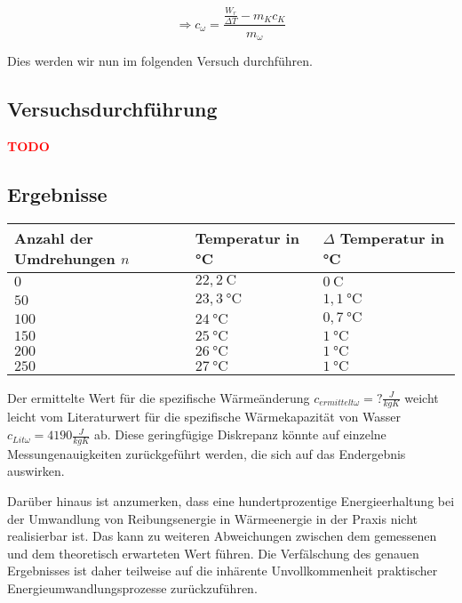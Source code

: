 		$$ \Rightarrow c_{\omega} = \frac{\frac{W_{r}}{\Delta T} - m_{K}c_{K}}{m_{\omega}}$$		
		
		Dies werden wir nun im folgenden Versuch durchführen.
		
	    \subsection{Versuchsdurchführung}
		
        \textbf{\textcolor{red}{TODO}}
	
  
    \subsection{Ergebnisse}

        \begin{table}[H]
            \centering
            \begin{tabular}{|l|l|l|}
                \hline
                Anzahl der Umdrehungen $n$ & Temperatur in °C & $\Delta$ Temperatur in °C\\
                \hline
                $0$ & $22,2\ \mathrm{C}$ & $0\ \mathrm{C}$\\
                \hline
                $50$ & $23,3\ \mathrm{°C}$ & $1,1\ \mathrm{°C}$\\
                \hline
                $100$ & $24\ \mathrm{°C}$ & $0,7\ \mathrm{°C}$\\
                \hline
                $150$ & $25\ \mathrm{°C}$ & $1\ \mathrm{°C}$\\
                \hline
                $200$ & $26\ \mathrm{°C}$ & $1\ \mathrm{°C}$\\
                \hline
                $250$ & $27\ \mathrm{°C}$ & $1\ \mathrm{°C}$\\
                \hline
            \end{tabular}
        \end{table}

        Der ermittelte Wert für die spezifische Wärmeänderung $c_{ermittelt\omega} = ? \frac{J}{kgK}$ weicht leicht vom Literaturwert für die spezifische Wärmekapazität von Wasser $c_{Lit\omega} = 4190 \frac{J}{kgK}$ ab. Diese geringfügige Diskrepanz könnte auf einzelne Messungenauigkeiten zurückgeführt werden, die sich auf das Endergebnis auswirken.
        
        Darüber hinaus ist anzumerken, dass eine hundertprozentige Energieerhaltung bei der Umwandlung von Reibungsenergie in Wärmeenergie in der Praxis nicht realisierbar ist. Das kann zu weiteren Abweichungen zwischen dem gemessenen und dem theoretisch erwarteten Wert führen. Die Verfälschung des genauen Ergebnisses ist daher teilweise auf die inhärente Unvollkommenheit praktischer Energieumwandlungsprozesse zurückzuführen. 


